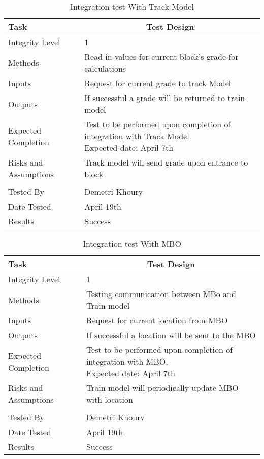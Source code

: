\documentclass[]{article}
\begin{document}
	\begin{table}[H]
		\centering
		\caption{Integration test With Track Model}
		\begin{tabular}{|l|l|}
			\hline
			Task & \multicolumn{1}{c|}{Test Design} \\ \hline
			Integrity Level & 1 \\ \hline
			Methods & Read in values for current block's grade for calculations \\ \hline
			Inputs & Request for current grade to track Model\\ \hline
			Outputs & If successful a grade will be returned to train model \\ \hline
			Expected Completion & \parbox[t]{10cm}{Test to be performed upon completion of integration with Track Model.\\ Expected date: April 7th}\\ \hline
			Risks and Assumptions & Track model will send grade upon entrance to block\\ \hline
				\\ \hline
			Tested By   &  Demetri Khoury\\	\hline
			Date Tested & \parbox[t]{10cm}{April 19th}\\ \hline
			Results & Success\\ \hline
		\end{tabular}
	\end{table}

	\begin{table}[H]
		\centering
		\caption{Integration test With MBO}
		\begin{tabular}{|l|l|}
			\hline
			Task & \multicolumn{1}{c|}{Test Design} \\ \hline
			Integrity Level & 1 \\ \hline
			Methods & Testing communication between MBo and Train model \\ \hline
			Inputs & Request for current location from MBO\\ \hline
			Outputs & If successful a location will be sent to the MBO \\ \hline
			Expected Completion & \parbox[t]{10cm}{Test to be performed upon completion of integration with MBO.\\ Expected date: April 7th}\\ \hline
			Risks and Assumptions & Train model will periodically update MBO with location\\ \hline
				\\ \hline
			Tested By   &  Demetri Khoury\\	\hline
			Date Tested & \parbox[t]{10cm}{April 19th}\\ \hline
			Results & Success\\ \hline
		\end{tabular}
	\end{table}
\end{document}
